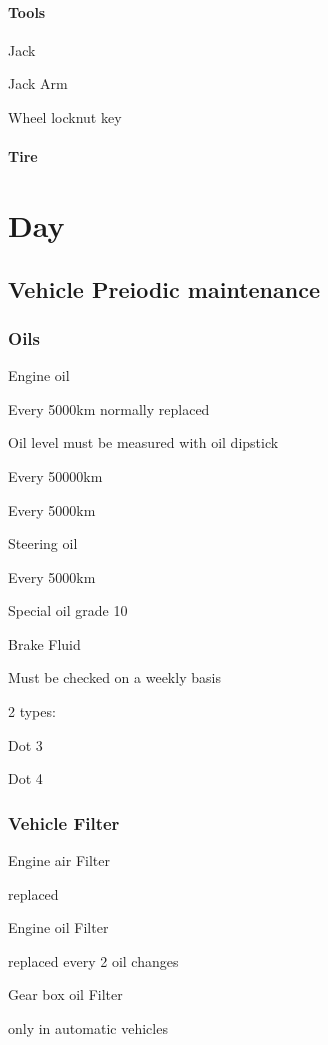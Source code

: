 \documentclass[openany]{book}
\begin{document}
\subsection{Tools}

Jack

Jack Arm

Wheel locknut key

\subsection{Tire}

\part{Day}

\chapter{Vehicle Preiodic maintenance}

\section{Oils}

Engine oil

Every 5000km normally replaced

Oil level must be measured with oil dipstick

Every 50000km


Every 5000km

Steering oil

Every 5000km

Special oil grade 10

Brake Fluid

Must be checked on a weekly basis

2 types:

Dot 3

Dot 4

\section{Vehicle Filter}

Engine air Filter

replaced

Engine oil Filter

replaced every 2 oil changes

Gear box oil Filter

only in automatic vehicles
\end{document}
